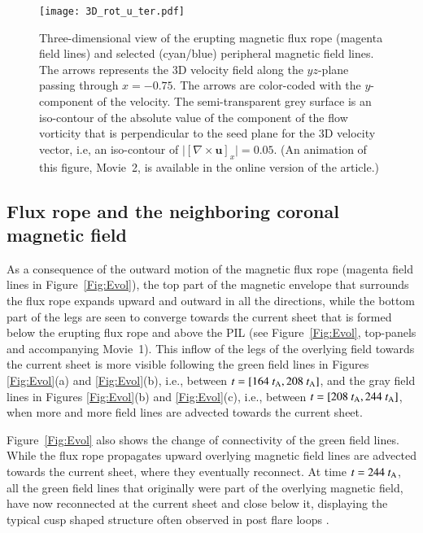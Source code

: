 \documentclass[apj]{emulateapj}
\newcommand{\tA}{t_{\rm A}}
\begin{document}
\begin{figure*}
\begin{center}
\texttt{[image: 3D\_rot\_u\_ter.pdf]}
\caption{Three-dimensional view of the erupting magnetic flux rope (magenta field lines) and selected (cyan/blue) peripheral magnetic field lines. The arrows represents the 3D velocity field along the $yz$-plane passing through $x=-0.75$. The arrows are color-coded with the $y$-component of the velocity. The semi-transparent grey surface is an iso-contour of the absolute value of the component of the flow vorticity that is perpendicular to the seed plane for the 3D velocity vector, i.e, an iso-contour of $\vert[\nabla \times \mathbf{u}]_x\vert = 0.05$. 
(An animation of this figure, Movie~2, is available in the online version of the article.)}%
\label{Fig:3D-Rot_u}
\end{center}
\end{figure*}


\subsection{Flux rope and the neighboring coronal magnetic field}
\label{Sec:T-Loops}

As a consequence of the outward motion of the magnetic flux rope (magenta field lines in Figure~\ref{Fig:Evol}), the top part of the magnetic envelope that surrounds the flux rope expands upward and outward in all the directions, while the bottom part of the legs are seen to converge towards the current sheet that is formed below the erupting flux rope and above the PIL (see Figure~\ref{Fig:Evol}, top-panels and  accompanying Movie~1). This inflow of the legs of the overlying field towards the current sheet is more visible following the green field lines in Figures \ref{Fig:Evol}(a) and \ref{Fig:Evol}(b), i.e., between $t=[164~\tA, 208~\tA]$, and the gray field lines in Figures \ref{Fig:Evol}(b) and \ref{Fig:Evol}(c), i.e., between $t=[208~\tA,244~\tA]$, when more and more field lines are advected towards the current sheet.  

Figure~\ref{Fig:Evol} also shows the change of connectivity of the green field lines. While the flux rope propagates upward overlying magnetic field lines are advected towards the current sheet, where they eventually reconnect. At time $t=244~\tA$, all the green field lines that originally were part of the overlying magnetic field, have now reconnected at the current sheet and close below it, displaying the typical cusp shaped structure often observed in post flare loops \citep[e.g.,][]{Yokoyama01,Liu10b}. 
\end{document}
